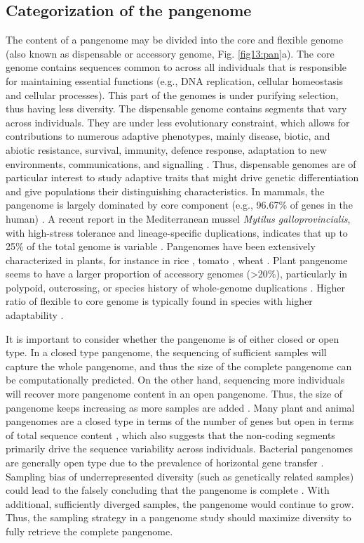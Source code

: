 \documentclass[../main.tex]{subfiles}
\begin{document}
\subsection*{Categorization of the pangenome}

The content of a pangenome may be divided into the core and flexible genome (also known  as dispensable or accessory genome, Fig. \ref{fig13:pan}a). The core genome contains sequences common to across all individuals that is responsible for maintaining essential functions (e.g., DNA replication, cellular homeostasis and cellular processes). This part of the genomes is under purifying selection, thus having less diversity. The dispensable genome contains segments that vary across individuals. They are under less evolutionary constraint, which allows for contributions to numerous adaptive phenotypes, mainly disease, biotic, and abiotic resistance, survival, immunity, defence response, adaptation to new environments, communications, and signalling \citep{golicz2020pangenomics}. Thus, dispensable genomes are of particular interest to study adaptive traits that might drive genetic differentiation and give populations their distinguishing characteristics. In mammals, the pangenome is largely dominated by core component (e.g., 96.67\% of genes in the human) \citep{duan2019hupan}. A recent report in the Mediterranean mussel \emph{Mytilus galloprovincialis}, with high-stress tolerance and lineage-specific duplications, indicates that up to 25\% of the total genome is variable \citep{gerdol2020massive}. Pangenomes have been extensively characterized in plants, for instance in rice \citep{zhao2018pan}, tomato \citep{gao2019tomato}, wheat \citep{walkowiak2020multiple}. Plant pangenome seems to have a larger proportion of accessory genomes (>20\%), particularly in polypoid, outcrossing, or species history of whole-genome duplications \citep{tao2019exploring}. Higher ratio of flexible to core genome is typically found in species with higher adaptability \citep{tranchant2018plant}. 

It is important to consider whether the pangenome is of either closed or open type. In a closed type pangenome, the sequencing of sufficient samples will capture the whole pangenome, and thus the size of the complete pangenome can be computationally predicted. On the other hand, sequencing more individuals will recover more pangenome content in an open pangenome. Thus, the size of pangenome keeps increasing as more samples are added \citep{golicz2020pangenomics}. Many plant and animal pangenomes are a closed type in terms of the number of genes but open in terms of total sequence content \citep{duan2019hupan,golicz2020pangenomics}, which also suggests that the non-coding segments primarily drive the sequence variability across individuals. Bacterial pangenomes  are generally open type due to the prevalence of horizontal gene transfer \citep{soucy2015horizontal}. Sampling bias of underrepresented diversity (such as genetically related samples) could lead to the falsely concluding that the pangenome is complete \citep{tranchant2018plant}. With additional, sufficiently  diverged samples, the  pangenome would continue to grow. Thus, the sampling strategy in a pangenome study should maximize diversity to fully retrieve the complete pangenome. 
\end{document}
